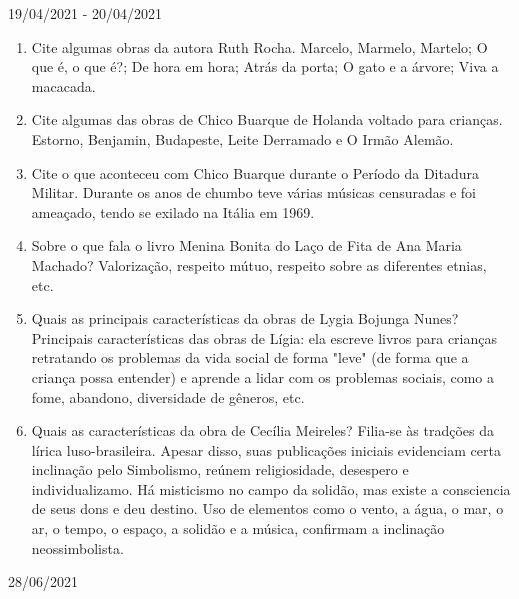 \documentclass{SchoolBook}
\begin{document}
\begin{day}{19/04/2021 - 20/04/2021}
\begin{enumerate}
            \item Cite algumas obras da autora Ruth Rocha.
            \response Marcelo, Marmelo, Martelo; O que é, o que é?; De hora em hora; Atrás da porta; O gato e a árvore; Viva a macacada.

            \item Cite algumas das obras de Chico Buarque de Holanda voltado para crianças.
            \response Estorno, Benjamin, Budapeste, Leite Derramado e O Irmão Alemão.

            \item Cite o que aconteceu com Chico Buarque durante o Período da Ditadura Militar.
            \response Durante os anos de chumbo teve várias músicas censuradas e foi ameaçado, tendo se exilado na Itália em 1969.

            \item Sobre o que fala o livro Menina Bonita do Laço de Fita de Ana Maria Machado?
            \response Valorização, respeito mútuo, respeito sobre as diferentes etnias, etc.

            \item Quais as principais características da obras de Lygia Bojunga Nunes?
            \response Principais características das obras de Lígia: ela escreve livros para crianças retratando os problemas da vida social de forma "leve" (de forma que a criança possa entender) e aprende a lidar com os problemas sociais, como a fome, abandono, diversidade de gêneros, etc.

            \item Quais as características da obra de Cecília Meireles?
            \response Filia-se às tradções da lírica luso-brasileira. Apesar disso, suas publicações iniciais evidenciam certa inclinação pelo Simbolismo, reúnem religiosidade, desespero e individualizamo. Há misticismo no campo da solidão, mas existe a consciencia de seus dons e deu destino. Uso de elementos como o vento, a água, o mar, o ar, o tempo, o espaço, a solidão e a música, confirmam a inclinação neossimbolista.
        \end{enumerate}
    \end{day}
    
    \begin{day}{28/06/2021}
        
    \end{day}
\end{document}
